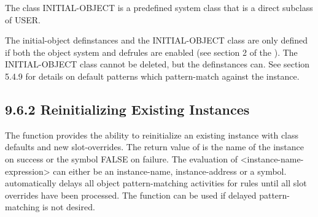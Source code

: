 \documentclass[letterpaper,10pt,english]{sphinxmanual}
\begin{document}
\begin{sphinxVerbatim}[commandchars=\\\{\}]
    
\end{sphinxVerbatim}

The class INITIAL-OBJECT is a predefined system class that is a direct
subclass of USER.

\begin{sphinxVerbatim}[commandchars=\\\{\}]
   
   
   
\end{sphinxVerbatim}

The initial-object definstances and the INITIAL-OBJECT class are only
defined if both the object system and defrules are enabled (see section
2 of the ). The INITIAL-OBJECT class cannot
be deleted, but the  definstances can. See section 5.4.9
for details on default patterns which pattern-match against the
 instance.


\subsection{9.6.2 Reinitializing Existing Instances}
\label{\detokenize{cool:reinitializing-existing-instances}}
The  function provides the ability to
reinitialize an existing instance with class defaults and new
slot-overrides. The return value of  is the name
of the instance on success or the symbol FALSE on failure. The
evaluation of \textless{}instance-name-expression\textgreater{} can either be an instance-name,
instance-address or a symbol.  automatically
delays all object pattern-matching activities for rules until all slot
overrides have been processed. The function
 can be used if delayed pattern-matching
is not desired.
\end{document}
